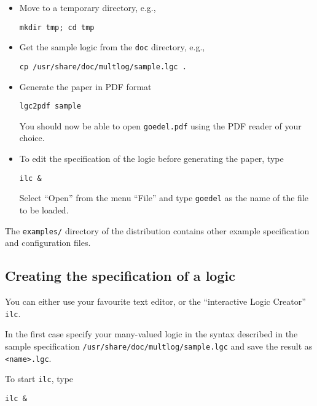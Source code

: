 \documentclass[]{article}
\begin{document}
\begin{itemize}
\item
  Move to a temporary directory, e.g.,

\begin{verbatim}
mkdir tmp; cd tmp
\end{verbatim}
\item
  Get the sample logic from the \texttt{doc} directory, e.g.,

\begin{verbatim}
cp /usr/share/doc/multlog/sample.lgc .
\end{verbatim}
\item
  Generate the paper in PDF format

\begin{verbatim}
lgc2pdf sample
\end{verbatim}

  You should now be able to open \texttt{goedel.pdf} using the PDF
  reader of your choice.
\item
  To edit the specification of the logic before generating the paper,
  type

\begin{verbatim}
ilc &
\end{verbatim}

  Select ``Open'' from the menu ``File'' and type \texttt{goedel} as the
  name of the file to be loaded.
\end{itemize}

The \texttt{examples/} directory of the distribution contains other
example specification and configuration files.

\hypertarget{creating-the-specification-of-a-logic}{%
\subsection{Creating the specification of a
logic}\label{creating-the-specification-of-a-logic}}

You can either use your favourite text editor, or the ``interactive
Logic Creator'' \texttt{ilc}.

In the first case specify your many-valued logic in the syntax described
in the sample specification \texttt{/usr/share/doc/multlog/sample.lgc}
and save the result as \texttt{\textless{}name\textgreater{}.lgc}.

To start \texttt{ilc}, type

\begin{verbatim}
ilc &
\end{verbatim}
\end{document}
